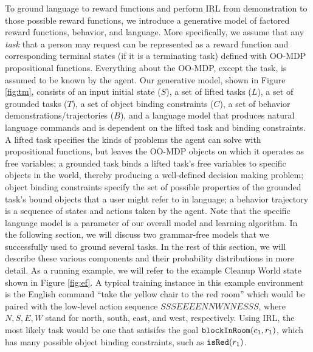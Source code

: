 \documentclass[conference]{IEEEtran}
\newcommand{\stnote}[1]{\textcolor{Blue}{\textbf{ST: #1}}}
\begin{document}
To ground language to reward functions and perform IRL from demonstration to those possible reward functions, we introduce a generative model of factored reward functions, behavior, and language. More specifically, we assume that any {\em task} that a person may request can be represented as a reward function and corresponding terminal states (if it is a terminating task) defined with OO-MDP propositional functions. 
Everything about the OO-MDP, except the task, is assumed to be known by the agent. Our generative model, shown in Figure \ref{fig:tm}, consists of an input initial state ($S$), a set of lifted tasks ($L$), a set of grounded tasks ($T$), a set of object binding constraints ($C$), a set of behavior demonstrations/trajectories ($B$), and a language model that produces natural language commands and is dependent on the lifted task and binding constraints. A lifted task specifies the kinds of problems the agent can solve with propositional functions, but leaves the OO-MDP objects on which it operates as free variables; a grounded task binds a lifted task's free variables to specific objects in the world, thereby producing a well-defined decision making problem; object binding constraints specify the set of possible properties of the grounded task's bound objects that a user might refer to in language; a behavior trajectory is a sequence of states and actions taken by the agent. Note that the specific language model is a parameter of our overall model and learning algorithm. In the following section, we will discuss two grammar-free models that we successfully used to ground several tasks. In the rest of this section, we will describe these various components and their probability distributions in more detail. As a running example, we will refer to the example Cleanup World state shown in Figure \ref{fig:ef}. A typical training instance in this example environment is the English command ``take the yellow chair to the red room'' which would be paired with the low-level action sequence $SSSEEEENNWNNESSS$, where $N, S, E, W$ stand for north, south, east, and west, respectively. Using IRL, the most likely task would be one that satisifes the goal ${\tt blockInRoom}(c_1, r_1)$, which has many possible object binding constraints, such as ${\tt isRed}(r_1)$.


\end{document}
